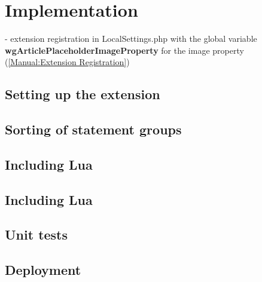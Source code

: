 	\section{Implementation}
	
	- extension registration in LocalSettings.php with the global variable \textbf{wgArticlePlaceholderImageProperty} for the image property (\href{https://www.mediawiki.org/wiki/Manual:Extension_registration}{[Manual:Extension Registration]})\\
	\subsection{Setting up the extension}
	
	
	
	\subsection{Sorting of statement groups}
	\subsection{Including Lua}
	
	\subsection{Including Lua}
	\subsection{Unit tests}
	\subsection{Deployment}
	